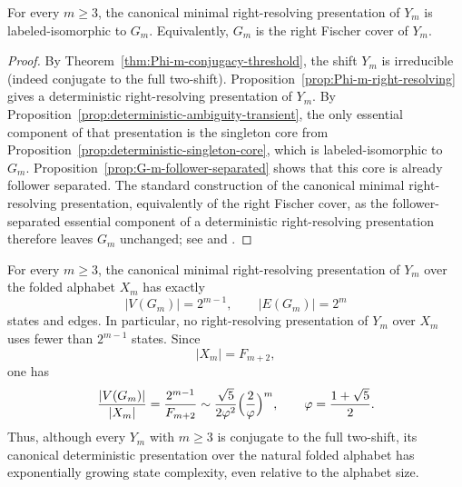 \begin{corollary}
\label{cor:G-m-fischer-cover}
For every $m\ge 3$, the canonical minimal right-resolving presentation of
$Y_m$ is labeled-isomorphic to $G_m$.  Equivalently, $G_m$ is the right
Fischer cover of $Y_m$.
\end{corollary}

\begin{proof}
By Theorem~\ref{thm:Phi-m-conjugacy-threshold}, the shift $Y_m$ is irreducible
(indeed conjugate to the full two-shift).  Proposition~\ref{prop:Phi-m-right-resolving}
gives a deterministic right-resolving presentation of $Y_m$.  By
Proposition~\ref{prop:deterministic-ambiguity-transient}, the only essential
component of that presentation is the singleton core from
Proposition~\ref{prop:deterministic-singleton-core}, which is labeled-isomorphic
to $G_m$.  Proposition~\ref{prop:G-m-follower-separated} shows that this core is
already follower separated.  The standard construction of the canonical
minimal right-resolving presentation, equivalently of the right Fischer cover,
as the follower-separated essential component of a deterministic
right-resolving presentation therefore leaves $G_m$ unchanged; see
\cite[Chs.~3--4]{LindMarcus1995} and \cite[Ch.~4]{Kitchens1998SymbolicDynamics}.
\end{proof}

\begin{theorem}
\label{thm:natural-state-complexity-gap}
For every $m\ge 3$, the canonical minimal right-resolving presentation of
$Y_m$ over the folded alphabet $X_m$ has exactly
\[
\lvert V(G_m)\rvert=2^{m-1},
\qquad
\lvert E(G_m)\rvert=2^m
\]
states and edges.  In particular, no right-resolving presentation of $Y_m$
over $X_m$ uses fewer than $2^{m-1}$ states.  Since
\[
\lvert X_m\rvert=F_{m+2},
\]
one has
\[
\frac{\lvert V(G_m)\rvert}{\lvert X_m\rvert}
=
\frac{2^{m-1}}{F_{m+2}}
\sim
\frac{\sqrt5}{2\varphi^2}\Bigl(\frac{2}{\varphi}\Bigr)^m,
\qquad
\varphi=\frac{1+\sqrt5}{2}.
\]
Thus, although every $Y_m$ with $m\ge 3$ is conjugate to the full two-shift,
its canonical deterministic presentation over the natural folded alphabet has
exponentially growing state complexity, even relative to the alphabet size.
\end{theorem}

